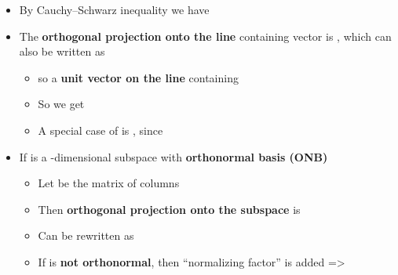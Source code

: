 \begin{itemize}

  \item
        By
        Cauchy--Schwarz inequality we have 
  \item
        The \textbf{orthogonal projection onto the line} containing vector
         is ,
        which can also be written as

        \begin{itemize}

          \item
                 so  a
                \textbf{unit vector on the line} containing 
          \item
                So we get
          \item
                A special case of  is
                , since
        \end{itemize}
  \item
        If  is a -dimensional
        subspace with \textbf{orthonormal basis (ONB)}

        \begin{itemize}

          \item
                Let
                be the matrix of columns 
          \item
                Then \textbf{orthogonal projection onto the subspace}  is
          \item
                Can be rewritten as
          \item
                If  is
                \textbf{not orthonormal}, then ``normalizing factor''
                 is added =>


\end{itemize}
\end{itemize}
